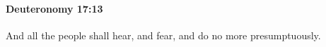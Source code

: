
		\paragraph{Deuteronomy 17:13} %
			\label{DEUTERONOMY-17-13}

			And all the people shall hear, and fear, and do no more presumptuously.


